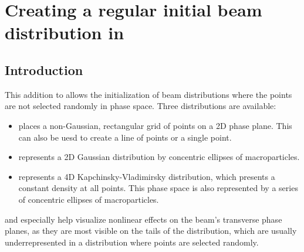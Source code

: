 \chapter{Creating a regular initial beam distribution in \bmad}

\section*{Introduction}
This addition to \bmad allows the initialization of beam distributions where the points are not selected randomly in phase space.  Three distributions are available: 
\begin{itemize}
\item {} places a non-Gaussian, rectangular grid of points on a 2D phase plane.  This can also be uesd to create a line of points or a single point.  
\item {} represents a 2D Gaussian distribution by concentric ellipses of macroparticles.
\item {} represents a 4D Kapchinsky-Vladimirsky distribution, which presents a constant density at all points.  This phase space is also represented by a series of concentric ellipses of macroparticles.  
\end{itemize}
 and  especially help visualize nonlinear effects on the beam's transverse phase planes, as they are most visible on the tails of the distribution, which are usually underrepresented in a distribution where points are selected randomly.

